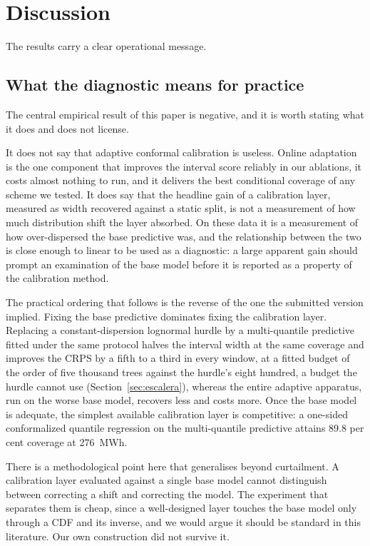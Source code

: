 \documentclass[preprint,3p,times]{elsarticle}
\providecommand{\DIFaddtex}[1]{{\protect\color{blue} \sf #1}} %
\providecommand{\DIFdeltex}[1]{{\protect\color{red} \scriptsize #1}} %
\providecommand{\DIFaddbegin}{} %
\providecommand{\DIFaddend}{} %
\providecommand{\DIFdelbegin}{} %
\providecommand{\DIFdelend}{} %
\providecommand{\DIFadd}[1]{\texorpdfstring{\DIFaddtex{#1}}{#1}} %
\providecommand{\DIFdel}[1]{\texorpdfstring{\DIFdeltex{#1}}{}} %
\begin{document}
\DIFaddend %
\section{Discussion}
\label{sec:discussion}

\DIFdelbegin \DIFdel{The results carry a clear operational message. }\DIFdelend \DIFaddbegin \subsection{What the diagnostic means for practice}

\DIFadd{The central empirical result of this paper is negative, and it is worth stating what it does and does not license.
}

\DIFadd{It does not say that adaptive conformal calibration is useless. Online adaptation is the one component that improves the interval score reliably in our ablations, it costs almost nothing to run, and it delivers the best conditional coverage of any scheme we tested. It does say that the headline gain of a calibration layer, measured as width recovered against a static split, is not a measurement of how much distribution shift the layer absorbed. On these data it is a measurement of how over-dispersed the base predictive was, and the relationship between the two is close enough to linear to be used as a diagnostic: a large apparent gain should prompt an examination of the base model before it is reported as a property of the calibration method.
}

\DIFadd{The practical ordering that follows is the reverse of the one the submitted version implied. Fixing the base predictive dominates fixing the calibration layer. Replacing a constant-dispersion lognormal hurdle by a multi-quantile predictive fitted under the same protocol halves the interval width at the same coverage and improves the CRPS by a fifth to a third in every window, at a fitted budget of the order of five thousand trees against the hurdle's eight hundred, a budget the hurdle cannot use (Section~\ref{sec:escalera}), whereas the entire adaptive apparatus, run on the worse base model, recovers less and costs more. Once the base model is adequate, the simplest available calibration layer is competitive: a one-sided conformalized quantile regression on the multi-quantile predictive attains 89.8 per cent coverage at 276~MWh.
}

\DIFadd{There is a methodological point here that generalises beyond curtailment. A calibration layer evaluated against a single base model cannot distinguish between correcting a shift and correcting the model. The experiment that separates them is cheap, since a well-designed layer touches the base model only through a CDF and its inverse, and we would argue it should be standard in this literature. Our own construction did not survive it.
}
\end{document}
